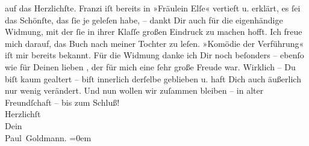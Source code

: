 \begin{ledgroupsized}[t]{13cm}
               auf das Herzlichſte. Franzi iſt bereits in »Fräulein Elſe« vertieft u. erklärt, es ſei das
               Schönſte, das ſie je geleſen habe, – dankt Dir auch für die eigenhändige Widmung, mit
               der ſie in ihrer Klaſſe großen Eindruck zu machen hofft. Ich freue mich darauf, das
                  Buch nach meiner Tochter zu leſen. »Komödie der Verführung« iſt mir bereits bekannt.
               Für die Widmung danke ich Dir noch beſonders – ebenſo wie für Deinen lieben \label{K_L03479-2v}\label{K_L03479-2h}, der für mich eine ſehr große Freude war. Wirklich – Du {\pb}biſt kaum gealtert – biſt innerlich derſelbe
               geblieben u. haft Dich auch äußerlich nur wenig verändert.\pend
           \pstart
           Und nun wollen wir zuſammen bleiben – in alter Freundſchaft – bis zum Schluß!
               {\\[\baselineskip]}Herzlichſt {\\[\baselineskip]}Dein {\\[\baselineskip]}\spacefill\mbox{Paul Goldmann.}\pend
           \leftskip=0em{}
         
         \endnumbering{}\end{ledgroupsized}\begin{anhang}\end{anhang}\newcommand{\dateiname}{L03479}\newcommand{\titel}{Paul Goldmann an Arthur Schnitzler, 24. 10. 1925}\newcommand{\editorInnen}{Martin Anton Müller und Laura Untner}
      
